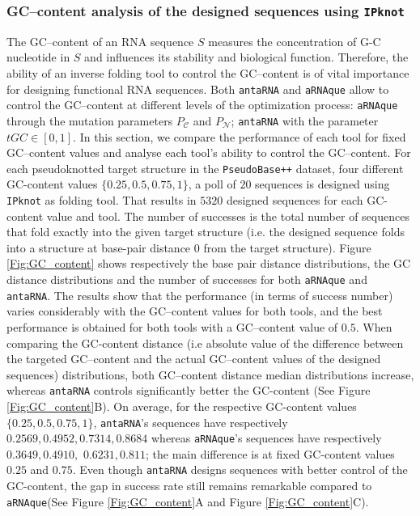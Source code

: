 \subsubsection{GC--content analysis of the designed sequences using \texttt{IPknot}}
The GC--content of an RNA sequence $S$ measures the concentration of G-C nucleotide in $S$ and influences its stability and biological function. Therefore, the ability of an inverse folding tool to control the GC--content is of vital importance for designing functional RNA sequences. Both \texttt{antaRNA} and \texttt{aRNAque} allow to control the GC--content at different levels of the optimization process: \texttt{aRNAque} through the mutation parameters $P_{\mathcal{C}}$ and $P_{\mathcal{N}}$; \texttt{antaRNA} with the parameter $tGC\in [ 0,1 ]$. In this section, we compare the performance of each tool for fixed GC--content values and analyse each tool's ability to control the GC--content. For each pseudoknotted target structure in the \texttt{PseudoBase++} dataset, four different GC-content values $\{0.25,0.5, 0.75, 1\}$, a poll of $20$ sequences is designed using \texttt{IPknot} as folding tool. That results in $5320$ designed sequences for each GC-content value and tool. The number of successes is the total number of sequences that fold exactly into the given target structure (i.e. the designed sequence folds into a structure at base-pair distance $0$ from the target structure). Figure \ref{Fig:GC_content} shows respectively the base pair distance distributions, the GC distance distributions and the number of successes for both \texttt{aRNAque} and \texttt{antaRNA}. The results show that the performance (in terms of success number) varies considerably with the GC--content values for both tools, and the best performance is obtained for both tools with a GC--content value of $0.5$. When comparing the GC-content distance (i.e absolute value of the difference between the targeted GC--content and the actual GC--content values of the designed sequences) distributions, both GC--content distance median distributions increase, whereas \texttt{antaRNA} controls significantly better the GC-content (See Figure \ref{Fig:GC_content}B). On average, for the respective GC-content values $\{0.25, 0.5, 0.75, 1\}$, \texttt{antaRNA}'s sequences have respectively $0.2569, 0.4952, 0.7314, 0.8684$ whereas  \texttt{aRNAque}'s sequences have respectively $0.3649, 0.4910,$ $ 0.6231, 0.811$; the main difference is at fixed GC-content values $0.25$ and $0.75$. Even though \texttt{antaRNA} designs sequences with better control of the GC-content, the gap in success rate still remains remarkable compared to \texttt{aRNAque}(See Figure \ref{Fig:GC_content}A and Figure \ref{Fig:GC_content}C).
